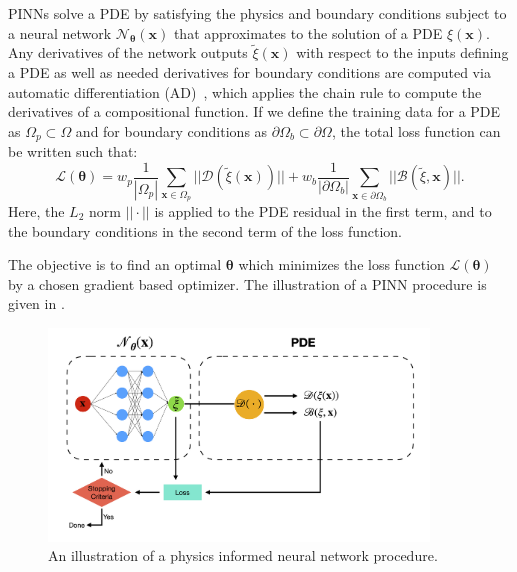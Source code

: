 PINNs solve a PDE by satisfying the physics and boundary conditions subject to a neural network $\mathcal{N_{\mathbf{\boldsymbol\theta}}}(\mathbf{x})$ that approximates to the solution of a PDE $\xi(\mathbf{x})$. Any derivatives of the network outputs $\tilde{\xi}(\mathbf{x})$ with respect to the inputs defining a PDE as well as needed derivatives for boundary conditions are computed via automatic differentiation (AD)~\cite{bprs:18}, which applies the chain rule to compute the derivatives of a compositional function. If we define the training data for a PDE as $\Omega_p \subset \Omega$ and for boundary conditions as $\partial \Omega_b \subset \partial \Omega $, the total loss function can be written such that:
\begin{equation}
    \label{eqn:loss_function}
    \mathcal{L}(\boldsymbol\theta) = w_p \frac{1}{|\Omega_p|}\sum_{\mathbf{x} \in \Omega_p} ||\mathcal{D}(\tilde{\xi}(\mathbf{x}))||+w_b \frac{1}{|\partial \Omega_b|}\sum_{\mathbf{x} \in \partial \Omega_b} ||\mathcal{B}(\tilde{\xi},\mathbf{x})||.
\end{equation}
Here, the $L_2$ norm $||\cdot||$ is applied to the PDE residual in the first term, and to the boundary conditions in the second term of the loss function.

The objective is to find an optimal $\boldsymbol\theta$ which minimizes the loss function $\mathcal{L}(\boldsymbol\theta)$ by a chosen gradient based optimizer. The illustration of a PINN procedure is given in . 

\begin{figure}
 \centering
 \includegraphics[width=0.9\textwidth]{figures/chap02_preliminaries/pinn.png} 
 \caption{An illustration of a physics informed neural network procedure.}
 \label{fig:pinn}
\end{figure}


